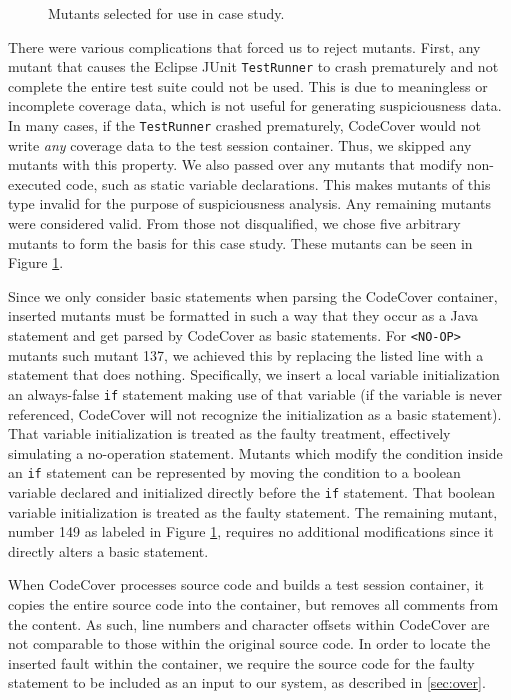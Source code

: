 \begin{figure}[tb]

\caption{Mutants selected for use in case study.}
\label{fig:mutants}
\end{figure}

There were various complications that forced us to reject mutants.  First, any mutant that
causes the Eclipse JUnit \texttt{TestRunner} to crash prematurely and not complete the entire test 
suite could not be used.  This is due to meaningless or incomplete coverage data, which is not useful
for generating suspiciousness data.  In many cases, if the \texttt{TestRunner} crashed prematurely,
CodeCover would not write \emph{any} coverage data to the test session container.  Thus, we skipped
any mutants with this property. We also passed over any mutants that modify non-executed code, such
as static variable declarations.  
This makes mutants of this type invalid for the purpose of suspiciousness analysis.  Any remaining
mutants were considered valid.  From those not disqualified, we chose five arbitrary mutants to 
form the basis for this case study.   These mutants can be seen in Figure \ref{fig:mutants}.

Since we only consider basic statements when parsing the CodeCover container, inserted mutants
must be formatted in such a way that they occur as a Java statement and get parsed by CodeCover
as basic statements.  For \texttt{<NO-OP>} mutants such mutant 137, we achieved this by replacing
the listed line with a statement that does nothing.  Specifically, we insert a local variable 
initialization an always-false \texttt{if} statement making use of that variable (if the variable
is never referenced, CodeCover will not recognize the initialization as a basic statement).  That 
variable initialization is treated as the faulty treatment, effectively simulating a no-operation
statement.  Mutants which modify the condition inside an \texttt{if} statement can be represented by 
moving the condition to a boolean variable declared and initialized directly before the \texttt{if}
statement.  That boolean variable initialization is treated as the faulty statement.  The remaining
mutant, number 149 as labeled in Figure \ref{fig:mutants}, requires no additional modifications since
it directly alters a basic statement.

When CodeCover processes source code and builds a test session container, it copies the entire source
code into the container, but removes all comments from the content.  As such, line numbers and character
offsets within CodeCover are not comparable to those within the original source code.  In
order to locate the inserted fault within the container, we require the source code for the faulty
statement to be included as an input to our system, as described in \ref{sec:over}.

